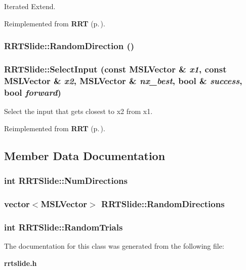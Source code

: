 Iterated Extend.



Reimplemented from {\bf RRT} {\rm (p.\,\pageref{class_RRT_b3})}.
\subsubsection{ RRTSlide::Random\-Direction ()}\label{class_RRTSlide_a4}


\subsubsection{ RRTSlide::Select\-Input (const {\bf MSLVector} \& {\em x1}, const {\bf MSLVector} \& {\em x2}, {\bf MSLVector} \& {\em nx\_\-best}, bool \& {\em success}, bool {\em forward})\hspace{0.3cm}{\tt  [virtual]}}\label{class_RRTSlide_a2}


Select the input that gets closest to x2 from x1.



Reimplemented from {\bf RRT} {\rm (p.\,\pageref{class_RRT_b0})}.

\subsection{Member Data Documentation}
\subsubsection{\setlength{\rightskip}{0pt plus 5cm}int RRTSlide::Num\-Directions}\label{class_RRTSlide_m1}


\subsubsection{\setlength{\rightskip}{0pt plus 5cm}vector$<${\bf MSLVector}$>$ RRTSlide::Random\-Directions}\label{class_RRTSlide_m2}


\subsubsection{\setlength{\rightskip}{0pt plus 5cm}int RRTSlide::Random\-Trials}\label{class_RRTSlide_m0}




The documentation for this class was generated from the following file:\begin{CompactItemize}
\item 
{\bf rrtslide.h}\end{CompactItemize}
